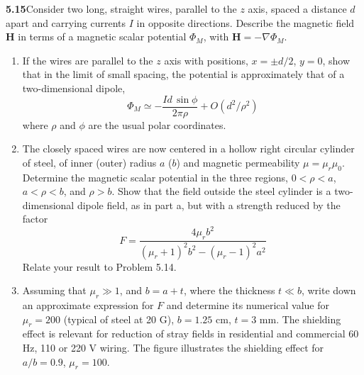 \par\bigskip
\noindent\textbf{5.15}\quad Consider two long, straight wires, parallel to the $z$ axis, spaced a distance $d$ apart and carrying currents $I$ in opposite directions. Describe the magnetic field $\mathbf{H}$ in terms of a magnetic scalar potential $\Phi_{M}$, with $\mathbf{H}=-\nabla\Phi_{M}$.
\begin{enumerate}
\item[(a)] If the wires are parallel to the $z$ axis with positions, $x=\pm d/2$, $y=0$, show that in the limit of small spacing, the potential is approximately that of a two-dimensional dipole,
\[
\Phi_{M}\simeq-\frac{Id\,\sin\phi}{2\pi\rho}+O(d^{2}/\rho^{2})
\]
where $\rho$ and $\phi$ are the usual polar coordinates.
\item[(b)] The closely spaced wires are now centered in a hollow right circular cylinder of steel, of inner (outer) radius $a$ ($b$) and magnetic permeability $\mu=\mu_{r}\mu_{0}$. Determine the magnetic scalar potential in the three regions, $0<\rho<a$, $a<\rho<b$, and $\rho>b$. Show that the field outside the steel cylinder is a two-dimensional dipole field, as in part a, but with a strength reduced by the factor
\[
F=\frac{4\mu_{r}b^{2}}{(\mu_{r}+1)^{2}b^{2}-(\mu_{r}-1)^{2}a^{2}}
\]
Relate your result to Problem 5.14.
\item[(c)] Assuming that $\mu_{r}\gg1$, and $b=a+t$, where the thickness $t\ll b$, write down an approximate expression for $F$ and determine its numerical value for $\mu_{r}=200$ (typical of steel at 20 G), $b=1.25$ cm, $t=3$ mm. The shielding effect is relevant for reduction of stray fields in residential and commercial 60 Hz, 110 or 220 V wiring. The figure illustrates the shielding effect for $a/b=0.9$, $\mu_{r}=100$.
\end{enumerate}

